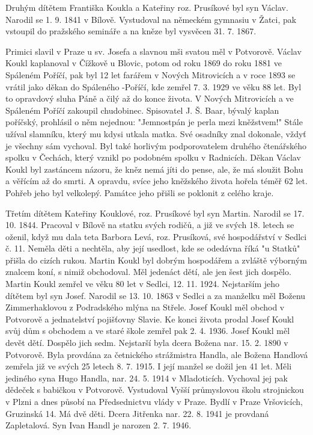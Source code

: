 \documentclass[../dejiny-rodu-prusiku.tex]{subfiles}
\begin{document}
Druhým dítětem Františka Koukla a Kateřiny roz. Prusíkové byl syn Václav. Narodil se 1. 9. 1841 v Bílově. Vystudoval na německém gymnasiu v Žatci, pak vstoupil do pražského semináře a na kněze byl vysvěcen 31. 7. 1867.

Primici slavil v Praze u sv. Josefa a slavnou mši svatou měl v Potvorově. Václav Koukl kaplanoval v Čížkově u Blovic, potom od roku 1869 do roku 1881 ve Spáleném Poříčí, pak byl 12 let farářem v Nových Mitrovicích a v roce 1893 se vrátil jako děkan do Spáleného -Poříčí, kde zemřel 7. 3. 1929 ve věku 88  let. Byl to opravdový sluha Páně a čilý až do konce života. V Nových Mitrovicích a ve Spáleném Poříčí zakoupil chudobinec. Spisovatel J. Š. Baar, bývalý kaplan poříčský, prohlásil o něm nejednou: "Jemnostpán je perla mezi kněžstvem!" Stále užíval slamníku, který mu kdysi utkala matka. Své osadníky znal dokonale, vždyť je všechny sám vychoval. Byl také horli­vým podporovatelem druhého čtenářského spolku v Če­chách, který vznikl po podobném spolku v Radnicích. Děkan Václav Koukl byl zastáncem názoru, že kněz ne­má jíti do pense, ale, že má sloužit Bohu a věřícím až do smrti. A opravdu, svíce jeho kněžského života hořela téměř 62 let. Pohřeb jeho byl velkolepý. Památce jeho přišli se poklonit z celého kraje.

Třetím dítětem Kateřiny Kouklové, roz. Prusíkové byl syn Martin. Narodil se 17. 10. 1844. Pracoval v Bílově na statku svých rodičů, a již ve svých 18. letech se oženil, když mu dala teta Barbora Levá, roz. Prusíková, své hospodářství v Sedlci č. 11. Neměla děti a nechtěla, aby její usedlost, kde se odedávna říká "u Statků" přišla do cizích rukou. Martin Koukl byl dobrým hospodářem a zvláště výborným znalcem koní, s nimiž obchodoval. Měl jedenáct dětí, ale jen šest jich dospě­lo. Martin Koukl zemřel ve věku 80 let v Sedlci, 12. 11. 1924. Nejstarším jeho dítětem byl syn Josef. Narodil se 13. 10. 1863 v Sedlci a za manželku měl Boženu Zimmerhaklovou z Podradského mlýna na Střele. Josef Koukl měl obchod v Potvorově a jednatelství pojišťovny Slavie. Ke konci života prodal Josef Koukl svůj dům s obchodem a ve staré škole zemřel pak 2. 4. 1936. Josef Koukl měl devět dětí. Dospělo jich sedm. Nejstarší byla dcera Bo­žena nar. 15. 2. 1890 v Potvorově. Byla provdána za četnického strážmistra Handla, ale Božena Handlová zemře­la již ve svých 25 letech 8. 7. 1915. I její manžel se dožil jen 41 let. Měli jediného syna Hugo Handla, nar. 24. 5. 1914 v Mladoticích. Vychoval jej pak dědeček s ba­bičkou v Potvorově. Vystudoval Vyšší průmyslovou školu strojnickou v Plzni a dnes působí na Předsednictvu vlády v Praze. Bydlí v Praze Vršovicích, Gruzinská 14. Má dvě děti. Dcera Jitřenka nar. 22. 8. 1941 je provdaná Zapletalová. Syn Ivan Handl je narozen 2. 7. 1946.
\end{document}
